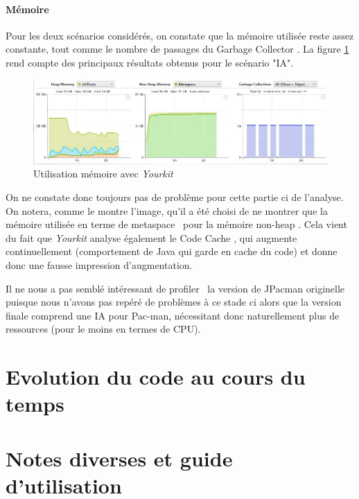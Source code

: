 \documentclass[12pt, openany]{report}
\begin{document}
\paragraph{Mémoire}
Pour les deux scénarios considérés, on constate que la mémoire utilisée reste assez constante, tout comme le nombre de passages du \og Garbage Collector \fg. La figure \ref{memory} rend compte des principaux résultats obtenus pour le scénario "IA".
\begin{figure}[h]
	\centering
	\includegraphics[width=16cm]{Images/memory.JPG}
	\caption{\label{memory} Utilisation mémoire avec \textit{Yourkit}}
\end{figure}

On ne constate donc toujours pas de problème pour cette partie ci de l'analyse. On notera, comme le montre l'image, qu'il a été choisi de ne montrer que la mémoire utilisée en terme de \og metaspace \fg \, pour la mémoire \og non-heap \fg. Cela vient du fait que \textit{Yourkit} analyse également le \og Code Cache \fg, qui augmente continuellement (comportement de Java qui garde en cache du code) et donne donc une fausse impression d'augmentation.

Il ne nous a pas semblé intéressant de \og profiler \fg \, la version de JPacman originelle puisque nous n'avons pas repéré de problèmes à ce stade ci alors que la version finale comprend une IA pour Pac-man, nécessitant donc naturellement plus de ressources (pour le moins en termes de CPU).

\section{Evolution du code au cours du temps}



\section{Notes diverses et guide d'utilisation}
\end{document}
